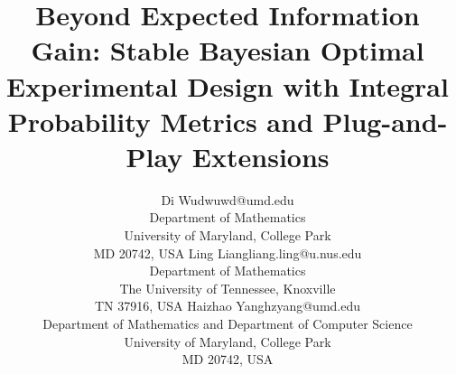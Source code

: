 \documentclass[twoside,11pt]{article}
\begin{document}
\title{Beyond Expected Information Gain: Stable Bayesian Optimal Experimental Design with Integral Probability Metrics and Plug-and-Play Extensions}

\renewcommand{\thefootnote}{\fnsymbol{footnote}}

\author{\name Di Wu\footnotemark[1] \email dwuwd@umd.edu \\
       \addr Department of Mathematics\\
       University of Maryland, College Park\\
       MD 20742, USA
       \AND
       \name Ling Liang\footnotemark[1] \email liang.ling@u.nus.edu \\
       \addr Department of Mathematics\\
       The University of Tennessee, Knoxville\\
       TN 37916, USA
       \AND
       \name Haizhao Yang\footnotemark[2] \email hzyang@umd.edu \\
       \addr Department of Mathematics and Department of Computer Science\\
       University of Maryland, College Park\\
       MD 20742, USA}

\renewcommand{\thefootnote}{\arabic{footnote}}



\maketitle
\end{document}
